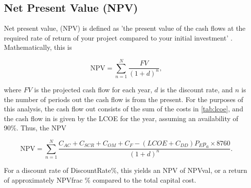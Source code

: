 \subsection{Net Present Value (NPV)}

Net present value, (NPV) is defined as 'the present value of the cash flows at the required rate of return of your project compared to your initial investment' \cite{gallo2014refresher}. Mathematically, this is

\begin{equation}
    \mbox{NPV} = \sum_{n=1}^N \frac{FV}{(1+d)^n},
\end{equation}

 where $FV$ is the projected cash flow for each year, $d$ is the discount rate, and $n$ is the number of periods out the cash flow is from the present. For the purposes of this analysis, the cash flow out consists of the sum of the costs in \ref{tab:lcoe}, and the cash flow in is given by the LCOE for the year, assuming an availability of 90\%. Thus, the NPV

 \begin{equation}
     \mbox{NPV} = \sum_{n=1}^N \frac{C_{AC}+ C_{SCR}+ C_{OM} +C_F - (LCOE + C_{DD})P_Ep_a \times 8760 }{(1+d)^n}.
 \end{equation}

For a discount rate of DiscountRate\%, this yields an NPV of NPVval, or a return of approximately NPVfrac \% compared to the total capital cost.